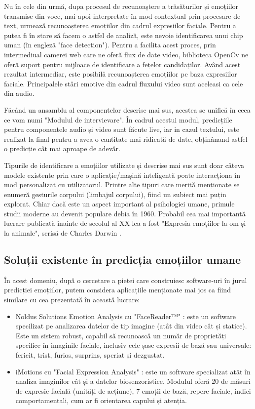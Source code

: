 \documentclass[a4paper, 12pt]{report}
\begin{document}
	Nu în cele din urmă, dupa procesul de recunoaștere a trăsăturilor și emoțiilor transmise din voce, mai apoi interpretate în mod contextual prin procesare de text, urmează recunoașterea emoțiilor din cadrul expresiilor faciale. Pentru a putea fi în stare să facem o astfel de analiză, este nevoie identificarea unui chip uman (în engleză "face detection"). Pentru a facilita acest proces, prin intermediual camerei web care ne oferă flux de date video, biblioteca OpenCv\cite{open_cv} ne oferă suport pentru mijloace de identificare a fețelor candidaților. Având acest rezultat intermediar, este posibilă recunoașterea emoțiilor pe baza expresiilor faciale. Principalele stări emotive din cadrul fluxului video sunt aceleasi ca cele din audio.
	
	Făcând un ansamblu al componentelor descrise mai sus, acestea se unifică în ceea ce vom numi "Modulul de intervievare". În cadrul acestui modul, predicțiile pentru componentele audio și video sunt făcute live, iar in cazul textului, este realizat la final pentru a avea o cantitate mai ridicată de date, obținânand astfel o predicție cât mai aproape de adevăr.
	
	Tipurile de identificare a emoțiilor utilizate și descrise mai sus sunt doar câteva modele existente prin care o aplicație/mașină inteligentă poate interacționa în mod personalizat cu utilizatorul. Printre alte tipuri care merită menționate se enumeră gesturile corpului (limbajul corpului), fiind un subiect mai puțin explorat. Chiar dacă este un aspect important al psihologiei umane, primule studii moderne au devenit populare debia în 1960. Probabil cea mai importantă lucrare publicată înainte de secolul al XX-lea a fost "Expresia emoțiilor la om și la animale", scrisă de Charles Darwin \cite{human_body_lang_darwin}.
	
	\subsection{Soluții existente în predicția emoțiilor umane}
	În acest domeniu, după o cercetare a pieței care construiesc software-uri în jurul predicției emoțiilor, putem considera aplicațiile menționate mai jos ca fiind similare cu cea prezentată în această lucrare:
	\begin{itemize}
		\item Noldus Solutions Emotion Analysis cu "FaceReader™" \cite{noldus}: este un software specilizat pe analizarea datelor de tip imagine (atât din video cât și statice). Este un sistem robust, capabil să recunoască un număr de proprietăți specifice în imaginile faciale, inclusiv cele șase expresii de bază sau universale: fericit, trist, furios, surprins, speriat și dezgustat.
		\item iMotions cu "Facial Expression Analysis" \cite{imotions}: este un software specializat atât în analiza imaginilor cât și a datelor biosenzoristice. Modulul oferă 20 de măsuri de expresie facială (unități de acțiune), 7 emoții de bază, repere faciale, indici comportamentali, cum ar fi orientarea capului și atenția.
	\end{itemize}
	
\end{document}
